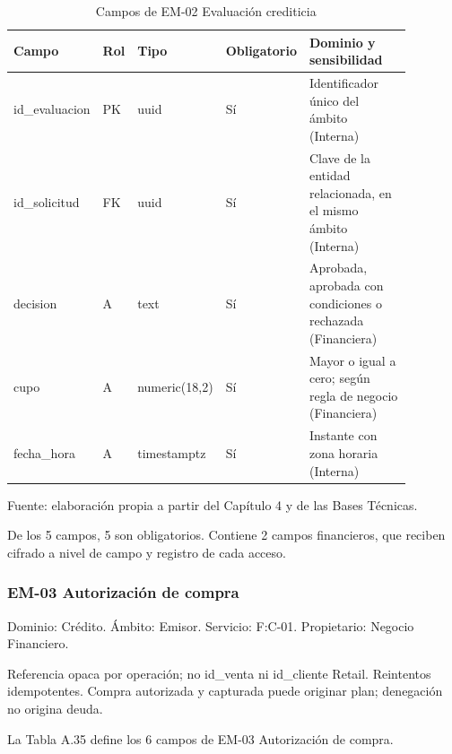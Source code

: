 \documentclass[11pt]{article}
\begin{document}
\begin{table}[htbp]
\caption{Campos de EM-02 Evaluación crediticia}\label{tab:d_em02}
\centering
\begin{tabular}{@{}p{0.167\linewidth}p{0.070\linewidth}p{0.079\linewidth}p{0.097\linewidth}p{0.465\linewidth}@{}}
\toprule Campo & Rol & Tipo & Obligatorio & Dominio y sensibilidad \\
\midrule
id\_evaluacion & PK & uuid & Sí & Identificador único del ámbito (Interna) \\
id\_solicitud & FK & uuid & Sí & Clave de la entidad relacionada, en el mismo ámbito (Interna) \\
decision & A & text & Sí & Aprobada, aprobada con condiciones o rechazada (Financiera) \\
cupo & A & numeric(18,2) & Sí & Mayor o igual a cero; según regla de negocio (Financiera) \\
fecha\_hora & A & timestamptz & Sí & Instante con zona horaria (Interna) \\
\bottomrule
\end{tabular}
\par\smallskip
{\raggedright Fuente: elaboración propia a partir del Capítulo 4 y de las Bases Técnicas.\par}
\end{table}


De los 5 campos, 5 son obligatorios. Contiene 2 campos financieros, que reciben cifrado a nivel de campo y registro de cada acceso.

\subsubsection{EM-03 Autorización de compra}

Dominio: Crédito. Ámbito: Emisor. Servicio: F:C-01. Propietario: Negocio Financiero.

Referencia opaca por operación; no id\_venta ni id\_cliente Retail. Reintentos idempotentes. Compra autorizada y capturada puede originar plan; denegación no origina deuda.

La Tabla A.35 define los 6 campos de EM-03 Autorización de compra.
\end{document}
